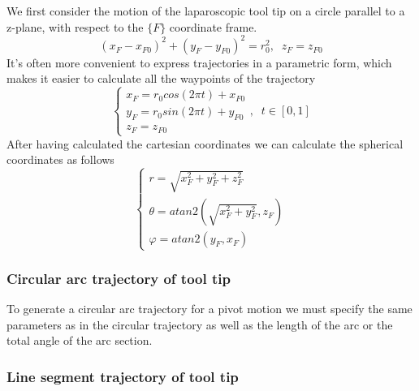We first consider the motion of the laparoscopic tool tip on a circle parallel to a z-plane, with respect to the $\lbrace F \rbrace$ coordinate frame.
\[
(x^{}_{F} - x^{}_{F0})^2 + (y^{}_{F} - y^{}_{F0})^2 = r_0^2, \;\; z^{}_{F} = z^{}_{F0}
\]
It's often more convenient to express trajectories in a parametric form, which makes it easier to calculate all the waypoints of the trajectory
\[
\begin{cases}
x^{}_{F} = r_0cos(2πt) + x^{}_{F0} \\
y^{}_{F} = r_0sin(2πt) + y^{}_{F0} \\
z^{}_{F} = z^{}_{F0}
\end{cases} ,
\;\;
t \in [0, 1]
\]
After having calculated the cartesian coordinates we can calculate the spherical coordinates as follows
\begin{equation}
\label{eqns:cartesian-to-spherical}
\begin{cases}
r = \sqrt{x^{2}_{F} + y^{2}_{F} + z^{2}_{F}} \\
θ = atan2 \left( \sqrt{x^{2}_{F} + y^{2}_{F}}, z^{}_{F} \right) \\
φ = atan2(y^{}_{F}, x^{}_{F})
\end{cases}
\end{equation}

\subsubsection{Circular arc trajectory of tool tip}

To generate a circular arc trajectory for a pivot motion we must specify the same parameters as 
in the circular trajectory as well as the length of the arc or the total angle of the arc 
section.


\subsubsection{Line segment trajectory of tool tip}

